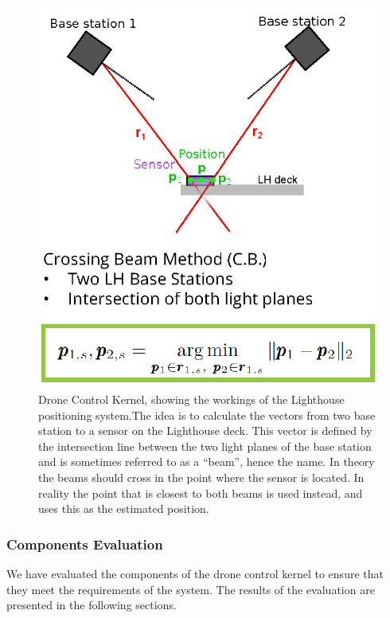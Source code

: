 \begin{figure}[htbp]
    \centerline{\includegraphics{images/lighthouseworking.png}}
    \caption{Drone Control Kernel, showing the workings of the Lighthouse positioning system.The idea is to calculate the vectors from two base station to a sensor on the Lighthouse deck. This vector is defined by the intersection line between the two light planes of the base station and is sometimes referred to as a “beam”, hence the name.
    In theory the beams should cross in the point where the sensor is located. In reality the point that is closest to both beams is used instead, and uses this as the estimated position. \cite{noauthor_lighthouse_nodate}}
    \label{fig}
    \end{figure}

\subsubsection{Components Evaluation}

We have evaluated the components of the drone control kernel to ensure that they meet the requirements of the system. The results of the evaluation are presented in the following sections.


